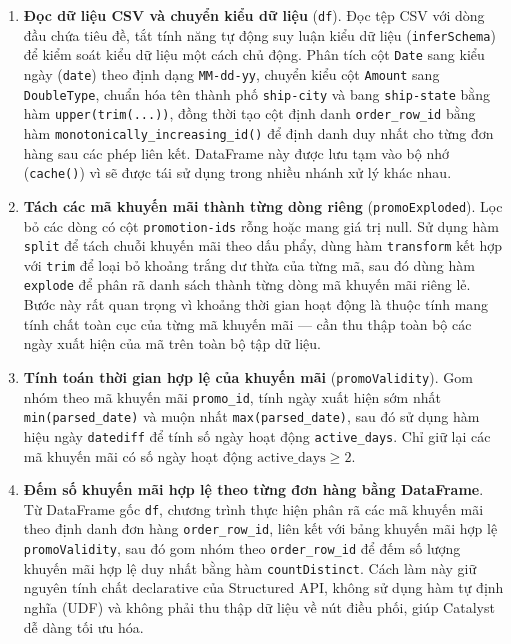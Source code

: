 \begin{enumerate}
    \item \textbf{Đọc dữ liệu CSV và chuyển kiểu dữ liệu} (\texttt{df}).
    Đọc tệp CSV với dòng đầu chứa tiêu đề, tắt tính năng tự động suy luận kiểu dữ liệu (\texttt{inferSchema}) để kiểm soát kiểu dữ liệu một cách chủ động. Phân tích cột \texttt{Date} sang kiểu ngày (\texttt{date}) theo định dạng \texttt{MM-dd-yy}, chuyển kiểu cột \texttt{Amount} sang \texttt{DoubleType}, chuẩn hóa tên thành phố \texttt{ship-city} và bang \texttt{ship-state} bằng hàm \texttt{upper(trim(...))}, đồng thời tạo cột định danh \texttt{order\_row\_id} bằng hàm \texttt{monotonically\_increasing\_id()} để định danh duy nhất cho từng đơn hàng sau các phép liên kết. DataFrame này được lưu tạm vào bộ nhớ (\texttt{cache()}) vì sẽ được tái sử dụng trong nhiều nhánh xử lý khác nhau.

    \item \textbf{Tách các mã khuyến mãi thành từng dòng riêng} (\texttt{promoExploded}).
    Lọc bỏ các dòng có cột \texttt{promotion-ids} rỗng hoặc mang giá trị null. Sử dụng hàm \texttt{split} để tách chuỗi khuyến mãi theo dấu phẩy, dùng hàm \texttt{transform} kết hợp với \texttt{trim} để loại bỏ khoảng trắng dư thừa của từng mã, sau đó dùng hàm \texttt{explode} để phân rã danh sách thành từng dòng mã khuyến mãi riêng lẻ. Bước này rất quan trọng vì khoảng thời gian hoạt động là thuộc tính mang tính chất toàn cục của từng mã khuyến mãi — cần thu thập toàn bộ các ngày xuất hiện của mã trên toàn bộ tập dữ liệu.

    \item \textbf{Tính toán thời gian hợp lệ của khuyến mãi} (\texttt{promoValidity}).
    Gom nhóm theo mã khuyến mãi \texttt{promo\_id}, tính ngày xuất hiện sớm nhất \texttt{min(parsed\_date)} và muộn nhất \texttt{max(parsed\_date)}, sau đó sử dụng hàm hiệu ngày \texttt{datediff} để tính số ngày hoạt động \texttt{active\_days}. Chỉ giữ lại các mã khuyến mãi có số ngày hoạt động $\text{active\_days} \geq 2$.

    \item \textbf{Đếm số khuyến mãi hợp lệ theo từng đơn hàng bằng DataFrame}.
    Từ DataFrame gốc \texttt{df}, chương trình thực hiện phân rã các mã khuyến mãi theo định danh đơn hàng \texttt{order\_row\_id}, liên kết với bảng khuyến mãi hợp lệ \texttt{promoValidity}, sau đó gom nhóm theo \texttt{order\_row\_id} để đếm số lượng khuyến mãi hợp lệ duy nhất bằng hàm \texttt{countDistinct}. Cách làm này giữ nguyên tính chất declarative của Structured API, không sử dụng hàm tự định nghĩa (UDF) và không phải thu thập dữ liệu về nút điều phối, giúp Catalyst dễ dàng tối ưu hóa.


\end{enumerate}
